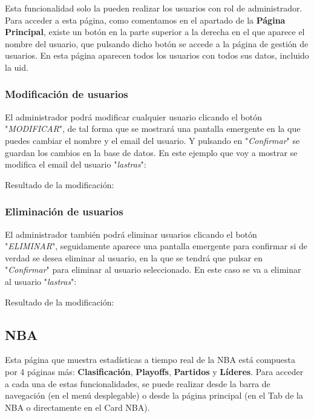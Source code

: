 Esta funcionalidad solo la pueden realizar los usuarios con rol de administrador. Para acceder a esta página, como comentamos en el apartado de la \textbf{Página Principal}, existe un botón en la parte superior a la derecha en el que aparece el nombre del usuario, que pulsando dicho botón se accede a la página de gestión de usuarios. En esta página aparecen todos los usuarios con todos sus datos, incluido la uid.


\subsubsection{Modificación de usuarios}

El administrador podrá modificar cualquier usuario clicando el botón "\textit{MODIFICAR}", de tal forma que se mostrará una pantalla emergente en la que puedes cambiar el nombre y el email del usuario. Y pulsando en "\textit{Confirmar}" se guardan los cambios en la base de datos. En este ejemplo que voy a mostrar se modifica el email del usuario "\textit{lastras}":


Resultado de la modificación:

\subsubsection{Eliminación de usuarios}

El administrador también podrá eliminar usuarios clicando el botón "\textit{ELIMINAR}", seguidamente aparece una pantalla emergente para confirmar si de verdad se desea eliminar al usuario, en la que se tendrá que pulsar en "\textit{Confirmar}" para eliminar al usuario seleccionado. En este caso se va a eliminar al usuario "\textit{lastras}":


Resultado de la modificación:


\subsection{NBA}

Esta página que muestra estadísticas a tiempo real de la NBA está compuesta por 4 páginas más: \textbf{Clasificación}, \textbf{Playoffs}, \textbf{Partidos} y \textbf{Líderes}. Para acceder a cada una de estas funcionalidades, se puede realizar desde la barra de navegación (en el menú desplegable) o desde la página principal (en el Tab de la NBA o directamente en el Card NBA).

